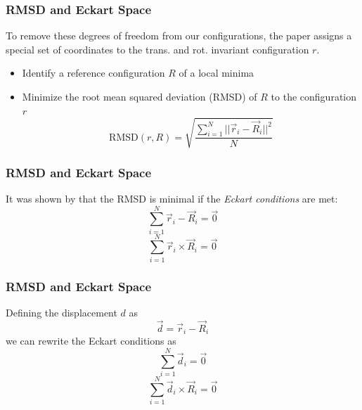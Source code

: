 \documentclass{beamer}
\begin{document}
	\begin{frame}
		\frametitle{RMSD and Eckart Space}
		To remove these degrees of freedom from our configurations, the paper assigns a special set of coordinates to the trans. and rot. invariant configuration $r$.
		\begin{itemize}
			\item Identify a reference configuration $R$ of a local minima
			\item Minimize the root mean squared deviation (RMSD) of $R$ to the configuration $r$
			\begin{equation}
				\text{RMSD}(r, R)=\sqrt{\frac{\sum_{i=1}^N ||\vec{r}_i-\vec{R}_i||^2}{N}}
			\end{equation}
		\end{itemize}
	\end{frame}

	\begin{frame}
		\frametitle{RMSD and Eckart Space}
		It was shown by \citeauthor{Kudin2005} \cite{Kudin2005} that the RMSD is minimal if the \emph{Eckart conditions} are met:
		\begin{equation}
			\sum_{i=1}^N \vec{r}_i - \vec{R}_i = \vec{0}
		\end{equation}
		\begin{equation}
			\sum_{i=1}^N \vec{r}_i \times \vec{R}_i = \vec{0}
		\end{equation}
	\end{frame}

	\begin{frame}
		\frametitle{RMSD and Eckart Space}
		Defining the displacement $d$ as
		\begin{equation}
			\vec{d}=\vec{r}_i-\vec{R}_i
		\end{equation}
		we can rewrite the Eckart conditions as
		\begin{equation}
			\sum_{i=1}^N \vec{d}_i= \vec{0}
			\label{eq:1}
		\end{equation}
		\begin{equation}
			\sum_{i=1}^N \vec{d}_i\times \vec{R}_i = \vec{0}
			\label{eq:2}
		\end{equation}

	\end{frame}		
\end{document}
